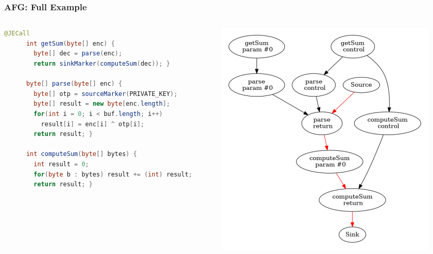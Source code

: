 \documentclass{beamer}
\begin{document}
\begin{frame}[fragile]
  \frametitle{AFG: Full Example}
  \begin{columns}
    \begin{column}{0.5\textwidth}
      \begin{lstlisting}[language=java, style=j, gobble=6, tabsize=2, basicstyle=\ttfamily\tiny]
      @JECall
      int getSum(byte[] enc) {
        byte[] dec = parse(enc);
        return sinkMarker(computeSum(dec)); }

      byte[] parse(byte[] enc) {
        byte[] otp = sourceMarker(PRIVATE_KEY);
        byte[] result = new byte[enc.length];
        for(int i = 0; i < buf.length; i++)
          result[i] = enc[i] ^ otp[i];
        return result; }

      int computeSum(byte[] bytes) {
        int result = 0;
        for(byte b : bytes) result += (int) result;
        return result; }
      \end{lstlisting}
    \end{column}
    \begin{column}{0.5\textwidth}
      \includegraphics[scale=0.4]{screenshot20201217010535.png}
    \end{column}
  \end{columns}
\end{frame}
\end{document}
